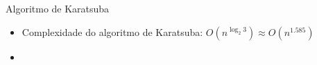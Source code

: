 \documentclass{beamer}
\begin{document}
\begin{frame}{Algoritmo de Karatsuba}
	\begin{itemize}
		\item Complexidade do algoritmo de Karatsuba: $O(n^{\log_{2}{3}})\approx O(n^{1.585})$
	\end{itemize}
\end{frame}

\begin{frame}
	\begin{itemize}
		\item 
	\end{itemize}
\end{frame}
\end{document}
